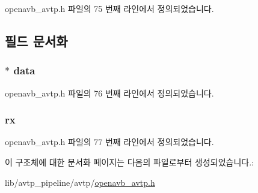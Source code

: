 openavb\+\_\+avtp.\+h 파일의 75 번째 라인에서 정의되었습니다.



\subsection{필드 문서화}
\subsubsection[{\texorpdfstring{data}{data}}]{$\ast$ data}\hypertarget{structavtp__info__t_af841be78d05c49dca097af1622b71c8e}{}\label{structavtp__info__t_af841be78d05c49dca097af1622b71c8e}


openavb\+\_\+avtp.\+h 파일의 76 번째 라인에서 정의되었습니다.

\subsubsection[{\texorpdfstring{rx}{rx}}]{ rx}\hypertarget{structavtp__info__t_abc1ad371e78eda623902e2d5e64f6afa}{}\label{structavtp__info__t_abc1ad371e78eda623902e2d5e64f6afa}


openavb\+\_\+avtp.\+h 파일의 77 번째 라인에서 정의되었습니다.



이 구조체에 대한 문서화 페이지는 다음의 파일로부터 생성되었습니다.\+:\begin{DoxyCompactItemize}
\item 
lib/avtp\+\_\+pipeline/avtp/\hyperlink{openavb__avtp_8h}{openavb\+\_\+avtp.\+h}\end{DoxyCompactItemize}
